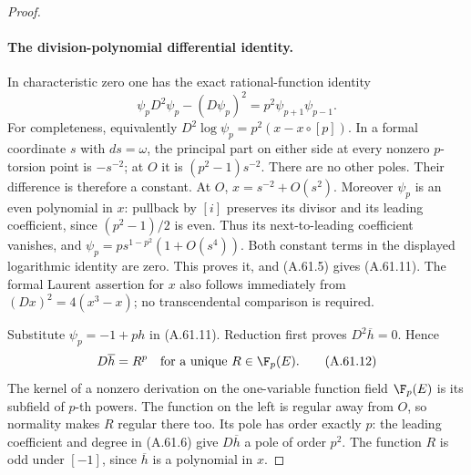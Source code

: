 \begin{proof}
\paragraph{The division-polynomial differential identity.}
In characteristic zero one has the exact rational-function
identity
\[
 \psi_p D^2\psi_p-(D\psi_p)^2
       =p^2\psi_{p+1}\psi_{p-1}.                      \tag{A.61.11}
\]
For completeness, equivalently
\(D^2\log\psi_p=p^2(x-x\circ[p])\).
In a formal coordinate \(s\) with \(ds=\omega\),
the principal part on either side at every nonzero
\(p\)-torsion point is \(-s^{-2}\); at \(O\) it is
\((p^2-1)s^{-2}\). There are no other poles. Their
difference is therefore a constant. At \(O\),
\(x=s^{-2}+O(s^2)\). Moreover \(\psi_p\) is an
even polynomial in \(x\): pullback by \([i]\)
preserves its divisor and its leading coefficient,
since \((p^2-1)/2\) is even. Thus its next-to-leading
coefficient vanishes, and
\(\psi_p=p s^{1-p^2}(1+O(s^4))\).
Both constant terms in the displayed logarithmic
identity are zero. This proves it, and (A.61.5)
gives (A.61.11). The formal Laurent assertion for
\(x\) also follows immediately from
\((Dx)^2=4(x^3-x)\); no transcendental comparison
is required.

Substitute \(\psi_p=-1+ph\) in (A.61.11).
Reduction first proves \(D^2\overline h=0\).
Hence
\[
                 D\overline h=R^p
               \quad\text{for a unique }R\in\F_p(E).
                                                        \tag{A.61.12}
\]
The kernel of a nonzero derivation on the one-variable
function field \(\F_p(E)\) is its subfield of
\(p\)-th powers. The function on the left is regular
away from \(O\), so normality makes \(R\) regular
there too. Its pole has order exactly \(p\): the
leading coefficient and degree in (A.61.6) give
\(D\overline h\) a pole of order \(p^2\).
The function \(R\) is odd under \([-1]\), since
\(\overline h\) is a polynomial in \(x\).


\end{proof}
